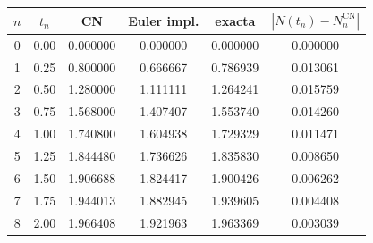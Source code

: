 \begin{tabular}{cccccc}\toprule
$n$ & $t_n$ & CN & Euler impl. & exacta & $|N(t_n) - N_n^{\mathrm{CN}}|$\\\midrule
0 & 0.00 & 0.000000 & 0.000000 & 0.000000 & 0.000000\\
1 & 0.25 & 0.800000 & 0.666667 & 0.786939 & 0.013061\\
2 & 0.50 & 1.280000 & 1.111111 & 1.264241 & 0.015759\\
3 & 0.75 & 1.568000 & 1.407407 & 1.553740 & 0.014260\\
4 & 1.00 & 1.740800 & 1.604938 & 1.729329 & 0.011471\\
5 & 1.25 & 1.844480 & 1.736626 & 1.835830 & 0.008650\\
6 & 1.50 & 1.906688 & 1.824417 & 1.900426 & 0.006262\\
7 & 1.75 & 1.944013 & 1.882945 & 1.939605 & 0.004408\\
8 & 2.00 & 1.966408 & 1.921963 & 1.963369 & 0.003039\\
\bottomrule
\end{tabular}
